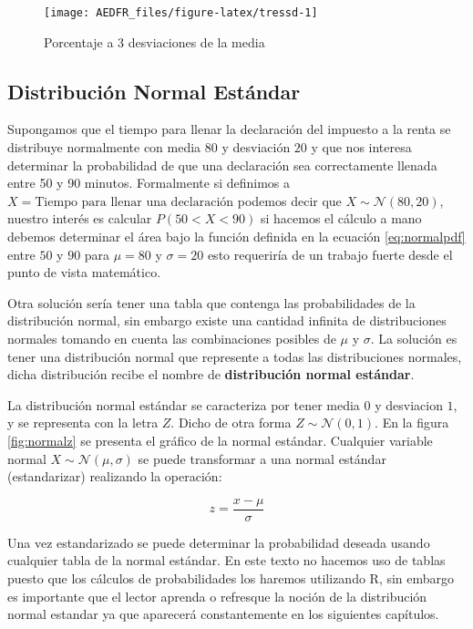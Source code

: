 \documentclass[letterpaper,]{book}
\begin{document}
\begin{figure}[h!]

{\centering \texttt{[image: AEDFR\_files/figure-latex/tressd-1]} 

}

\caption{Porcentaje a 3 desviaciones de la media}\label{fig:tressd}
\end{figure}

\hypertarget{dne}{%
\subsection{Distribución Normal Estándar}\label{dne}}

Supongamos que el tiempo para llenar la declaración del impuesto a la renta se distribuye normalmente con media \(80\) y desviación \(20\) y que nos interesa determinar la probabilidad de que una declaración sea correctamente llenada entre 50 y 90 minutos. Formalmente si definimos a \(X=\text{Tiempo para llenar una declaración}\) podemos decir que \(X \sim \mathcal{N}\left(80,20\right)\), nuestro interés es calcular \(P\left(50< X <90\right)\) si hacemos el cálculo a mano debemos determinar el área bajo la función definida en la ecuación \eqref{eq:normalpdf} entre \(50\) y \(90\) para \(\mu=80\) y \(\sigma=20\) esto requeriría de un trabajo fuerte desde el punto de vista matemático.

Otra solución sería tener una tabla que contenga las probabilidades de la distribución normal, sin embargo existe una cantidad infinita de distribuciones normales tomando en cuenta las combinaciones posibles de \(\mu\) y \(\sigma\). La solución es tener una distribución normal que represente a todas las distribuciones normales, dicha distribución recibe el nombre de \textbf{distribución normal estándar}.

La distribución normal estándar se caracteriza por tener media \(0\) y desviacion \(1\), y se representa con la letra \(Z\). Dicho de otra forma \(Z \sim \mathcal{N}\left(0,1\right)\). En la figura \ref{fig:normalz} se presenta el gráfico de la normal estándar.
Cualquier variable normal \(X\sim \mathcal{N}\left(\mu,\sigma\right)\) se puede transformar a una normal estándar (estandarizar) realizando la operación:

\begin{equation} 
z=\dfrac{x-\mu}{\sigma}
\label{eq:normalest}
\end{equation}

Una vez estandarizado se puede determinar la probabilidad deseada usando cualquier tabla de la normal estándar. En este texto no hacemos uso de tablas puesto que los cálculos de probabilidades los haremos utilizando R, sin embargo es importante que el lector aprenda o refresque la noción de la distribución normal estandar ya que aparecerá constantemente en los siguientes capítulos.
\end{document}
